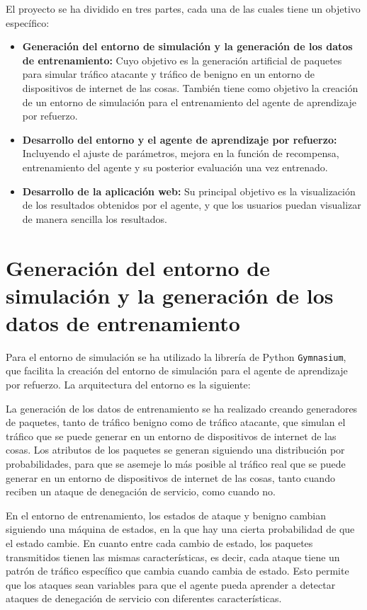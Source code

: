 
El proyecto se ha dividido en tres partes, cada una de las cuales tiene un objetivo específico:
\begin{itemize}
    \item \textbf{Generación del entorno de simulación y la generación de los datos de entrenamiento:} Cuyo objetivo es la generación artificial de paquetes para simular tráfico atacante y tráfico de benigno en un entorno de dispositivos de internet de las cosas. También tiene como objetivo la creación de un entorno de simulación para el entrenamiento del agente de aprendizaje por refuerzo.
    \item \textbf{Desarrollo del entorno y el agente de aprendizaje por refuerzo:} Incluyendo el ajuste de parámetros, mejora en la función de recompensa, entrenamiento del agente y su posterior evaluación una vez entrenado.
    \item \textbf{Desarrollo de la aplicación web:} Su principal objetivo es la visualización de los resultados obtenidos por el agente, y que los usuarios puedan visualizar de manera sencilla los resultados.
\end{itemize}

\section{Generación del entorno de simulación y la generación de los datos de entrenamiento}
Para el entorno de simulación se ha utilizado la librería de Python \texttt{Gymnasium}, que facilita la creación del entorno de simulación para el agente de aprendizaje por refuerzo.
La arquitectura del entorno es la siguiente:

La generación de los datos de entrenamiento se ha realizado creando generadores de paquetes, tanto de tráfico benigno como de tráfico atacante, que simulan el tráfico que se puede generar en un entorno de dispositivos de internet de las cosas. Los atributos de los paquetes se generan siguiendo una distribución por probabilidades, para que se asemeje lo más posible al tráfico real que se puede generar en un entorno de dispositivos de internet de las cosas, tanto cuando reciben un ataque de denegación de servicio, como cuando no.

En el entorno de entrenamiento, los estados de ataque y benigno cambian siguiendo una máquina de estados, en la que hay una cierta probabilidad de que el estado cambie. En cuanto entre cada cambio de estado, los paquetes transmitidos tienen las mismas características, es decir, cada ataque tiene un patrón de tráfico específico que cambia cuando cambia de estado. Esto permite que los ataques sean variables para que el agente pueda aprender a detectar ataques de denegación de servicio con diferentes características.

